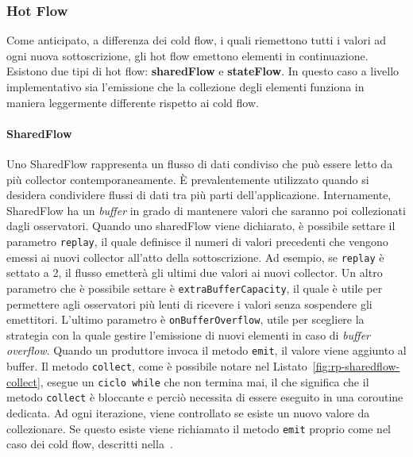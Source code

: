 \documentclass[12pt,a4paper,openright,twoside]{book}
\begin{document}
\subsubsection{Hot Flow}
\label{sec:hot-flow}
Come anticipato, a differenza dei cold flow, i quali riemettono tutti i valori ad ogni nuova sottoscrizione, gli hot flow emettono elementi in continuazione. 
Esistono due tipi di hot flow: \textbf{sharedFlow} e \textbf{stateFlow}. 
In questo caso a livello implementativo sia l'emissione che la collezione degli elementi funziona in maniera leggermente differente rispetto ai cold flow. 

\paragraph{SharedFlow}
Uno SharedFlow rappresenta un flusso di dati condiviso che può essere letto da più collector contemporaneamente. È prevalentemente utilizzato quando si desidera condividere flussi di dati tra più parti dell'applicazione. 
Internamente, SharedFlow ha un \textit{buffer} in grado di mantenere valori che saranno poi collezionati dagli osservatori. 
Quando uno sharedFlow viene dichiarato, è possibile settare il parametro \texttt{replay}, il quale definisce il numeri di valori precedenti che vengono emessi ai nuovi collector all'atto della sottoscrizione. Ad esempio, se \texttt{replay} è settato a 2, il flusso emetterà gli ultimi due valori ai nuovi collector. 
Un altro parametro che è possibile settare è \texttt{extraBufferCapacity}, il quale è utile per permettere agli osservatori più lenti di ricevere i valori senza sospendere gli emettitori. 
L'ultimo parametro è \texttt{onBufferOverflow}, utile per scegliere la strategia con la quale gestire l'emissione di nuovi elementi in caso di \textit{buffer overflow}. 
Quando un produttore invoca il metodo \texttt{emit}, il valore viene aggiunto al buffer. 
Il metodo \texttt{collect}, come è possibile notare nel Listato~\ref{fig:rp-sharedflow-collect}, esegue un \texttt{ciclo while} che non termina mai, il che significa che il metodo \texttt{collect} è bloccante e perciò necessita di essere eseguito in una coroutine dedicata. 
Ad ogni iterazione, viene controllato se esiste un nuovo valore da collezionare. Se questo esiste viene richiamato il metodo \texttt{emit} proprio come nel caso dei cold flow, descritti nella~. 


\end{document}
